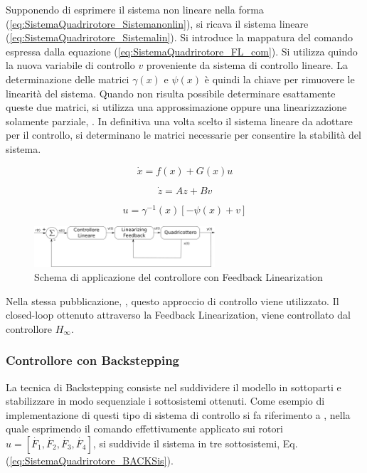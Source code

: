 Supponendo di esprimere il sistema non lineare nella forma (\ref{eq:SistemaQuadrirotore_Sistemanonlin}), si ricava il sistema lineare (\ref{eq:SistemaQuadrirotore_Sistemalin}). Si introduce la mappatura del comando espressa dalla equazione (\ref{eq:SistemaQuadrirotore_FL_com}). Si utilizza quindo la nuova variabile di controllo $v$ proveniente da sistema di controllo lineare. La determinazione delle matrici $\gamma(x)$ e $\psi(x)$ è quindi la chiave per rimuovere le linearità del sistema. Quando non risulta possibile determinare esattamente queste due matrici, si utilizza una approssimazione oppure una linearizzazione solamente parziale, \cite{Feedlin}. In definitiva una volta scelto il sistema lineare da adottare per il controllo, si determinano le matrici necessarie per consentire la stabilità del sistema.

\begin{equation}\label{eq:SistemaQuadrirotore_Sistemanonlin}
	\dot{x} = f(x) + G(x) u
\end{equation}

\begin{equation}\label{eq:SistemaQuadrirotore_Sistemalin}
	\dot{z} = A z + B v
\end{equation}

\begin{equation}\label{eq:SistemaQuadrirotore_FL_com}
	u = \gamma^{-1}(x) \left[- \psi(x)+v\right]
\end{equation}

\begin{figure}
	\centering
	\includegraphics[width=0.6\textwidth]{SistemaQuadrirotore/Figure/FLP}
	\caption{Schema di applicazione del controllore con Feedback Linearization}
\end{figure}

Nella stessa pubblicazione, \cite{G_inf}, questo approccio di controllo viene utilizzato. Il closed-loop ottenuto attraverso la Feedback Linearization, viene controllato dal controllore $H_\infty$.

\subsubsection{Controllore con Backstepping}
La tecnica di Backstepping consiste nel suddividere il modello in sottoparti e stabilizzare in modo sequenziale i sottosistemi ottenuti.
Come esempio di implementazione di questi tipo di sistema di controllo si fa riferimento a \cite{Backstepping}, nella quale esprimendo il comando effettivamente applicato sui rotori $u = \left[\dot{F_1} ,\dot{F_2}, \dot{F_3},\dot{F_4} \right]$, si suddivide il sistema in tre sottosistemi, Eq. (\ref{eq:SistemaQuadrirotore_BACKSis}).

